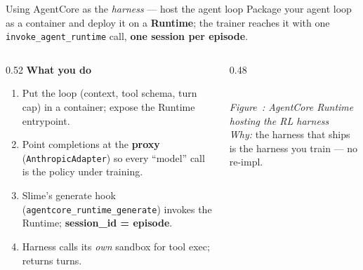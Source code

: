 \documentclass[aspectratio=169]{beamer}
\newcounter{deckfig}
\newcommand{\figtag}[1]{\refstepcounter{deckfig}%
  {\scriptsize\itshape Figure~\thedeckfig: #1}}
\begin{document}
\begin{frame}{Using AgentCore as the \emph{harness} --- host the agent loop}
  \footnotesize Package your agent loop as a container and deploy it on a \textbf{Runtime}; the trainer
  reaches it with one \texttt{invoke\_agent\_runtime} call, \textbf{one session per episode}.
  \begin{columns}[T]
    \begin{column}{0.52\textwidth}
      \textbf{What you do}
      \begin{enumerate}\setlength\itemsep{0.12em}
        \item[\textbf{1}] Put the loop (context, tool schema, turn cap) in a container; expose the
          Runtime entrypoint.
        \item[\textbf{2}] Point completions at the \textbf{proxy} (\texttt{AnthropicAdapter}) so every
          ``model'' call is the policy under training.
        \item[\textbf{3}] Slime's generate hook (\texttt{agentcore\_runtime\_generate}) invokes the
          Runtime; \textbf{session\_id = episode}.
        \item[\textbf{4}] Harness calls its \emph{own} sandbox for tool exec; returns turns.
      \end{enumerate}
    \end{column}
    \begin{column}{0.48\textwidth}
      \centering
      \\[0.2em]\figtag{AgentCore Runtime hosting the RL harness}
      \\[0.3em]\footnotesize \emph{Why:} the harness that ships is the harness you train --- no re-impl.
    \end{column}
  \end{columns}
\end{frame}
\end{document}
